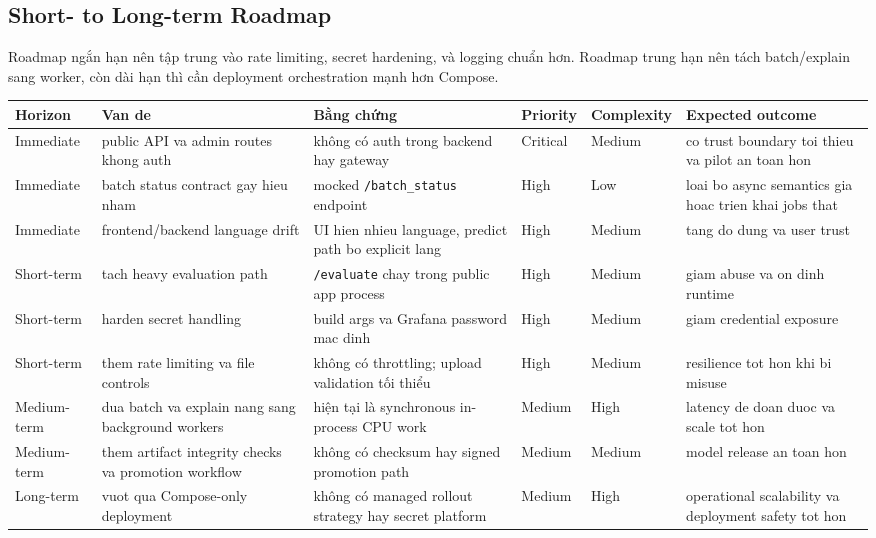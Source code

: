 \subsection{Short- to Long-term Roadmap}
Roadmap ngắn hạn nên tập trung vào rate limiting, secret hardening, và logging chuẩn hơn. Roadmap trung hạn nên tách batch/explain sang worker, còn dài hạn thì cần deployment orchestration mạnh hơn Compose.

\begin{longtable}{@{}p{}p{}p{}p{}p{}p{}@{}}
\toprule
\textbf{Horizon} & \textbf{Van de} & \textbf{Bằng chứng} & \textbf{Priority} & \textbf{Complexity} & \textbf{Expected outcome} \\
\midrule
\endhead
Immediate & public API va admin routes khong auth & không có auth trong backend hay gateway & Critical & Medium & co trust boundary toi thieu va pilot an toan hon \\
Immediate & batch status contract gay hieu nham & mocked \texttt{/batch\_status} endpoint & High & Low & loai bo async semantics gia hoac trien khai jobs that \\
Immediate & frontend/backend language drift & UI hien nhieu language, predict path bo explicit lang & High & Medium & tang do dung va user trust \\
Short-term & tach heavy evaluation path & \texttt{/evaluate} chay trong public app process & High & Medium & giam abuse va on dinh runtime \\
Short-term & harden secret handling & build args va Grafana password mac dinh & High & Medium & giam credential exposure \\
Short-term & them rate limiting va file controls & không có throttling; upload validation tối thiểu & High & Medium & resilience tot hon khi bi misuse \\
Medium-term & dua batch va explain nang sang background workers & hiện tại là synchronous in-process CPU work & Medium & High & latency de doan duoc va scale tot hon \\
Medium-term & them artifact integrity checks va promotion workflow & không có checksum hay signed promotion path & Medium & Medium & model release an toan hon \\
Long-term & vuot qua Compose-only deployment & không có managed rollout strategy hay secret platform & Medium & High & operational scalability va deployment safety tot hon \\
\bottomrule
\end{longtable}

